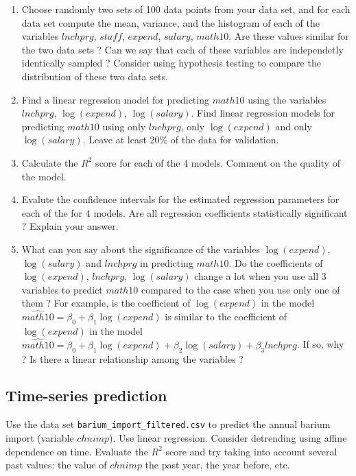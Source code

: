 \documentclass{article}
\begin{document}
  \begin{enumerate}
	 \item Choose randomly two sets of 100 data points from your data set, and for each data set compute the mean, variance, and the histogram
		 of each of the variables $lnchprg$, $staff$, $expend$, $salary$, $math10$. 
	Are these values similar for the two data sets ?  Can we say that each of these variables are independetly identically sampled ? 
	Consider using hypothesis testing to compare the distribution of these two data sets.



\item Find a linear regression model for predicting $math10$ using the variables $lnchprg$, $\log(expend)$, $\log(salary)$. Find linear
	regression models for predicting $math10$ using only  $lnchprg$, only $\log(expend)$ and only $\log(salary)$. 
   Leave at least 20\% of the data for validation. 
  \item Calculate the $R^2$ score for each of the $4$ models. Comment on the quality of the model.
  \item Evalute the confidence intervals for the estimated regression parameters for each of the for $4$ models. Are all regression coefficients statistically significant ? Explain your answer.
   \item
	What can you say about the significance of the variables $\log(expend)$, $\log(salary)$ and $lnchprg$
	in predicting $math10$.
	Do the coefficients of $\log(expend)$, $lnchprg$, $\log(salary)$ change a lot when you use all $3$ variables to predict $math10$ 
	compared to the case when you use only one of them ? For example, is the coefficient
		  of $\log(expend)$ in the model $\widehat{math10}=\beta_0+\beta_1 \log(expend)$  
		    is similar to the coefficient of $\log(expend)$ in the model   $\widehat{math10}=\beta_0+\beta_1 \log(expend)+\beta_2 \log(salary)+\beta_3 lnchprg$.
	If so, why ? Is there a linear relationship among the variables ? 

 \end{enumerate}


 \subsection*{Time-series prediction}
     Use the data set \lstinline$barium_import_filtered.csv$
      to predict the annual barium import
    (variable $chnimp$). Use linear regression.
   Consider detrending using affine  dependence on time.  
   Evaluate the $R^2$ score and try taking into account several past values: the value of $chnimp$ the past year, the year before, etc. 
\end{document}
